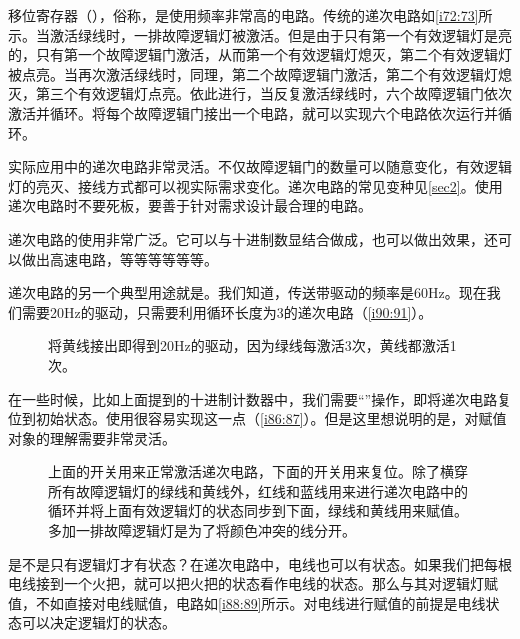 移位寄存器（），俗称，是使用频率非常高的电路。传统的递次电路如\autoref{i72:73}所示。当激活绿线时，一排故障逻辑灯被激活。但是由于只有第一个有效逻辑灯是亮的，只有第一个故障逻辑门激活，从而第一个有效逻辑灯熄灭，第二个有效逻辑灯被点亮。当再次激活绿线时，同理，第二个故障逻辑门激活，第二个有效逻辑灯熄灭，第三个有效逻辑灯点亮。依此进行，当反复激活绿线时，六个故障逻辑门依次激活并循环。将每个故障逻辑门接出一个电路，就可以实现六个电路依次运行并循环。

\begin{figure}[!ht]
\centering
{}%
%
\caption{}
\label{i72:73}
\end{figure}

实际应用中的递次电路非常灵活。不仅故障逻辑门的数量可以随意变化，有效逻辑灯的亮灭、接线方式都可以视实际需求变化。递次电路的常见变种见\autoref{sec2}。使用递次电路时不要死板，要善于针对需求设计最合理的电路。

递次电路的使用非常广泛。它可以与十进制数显结合做成，也可以做出效果，还可以做出高速电路，等等等等等等。

递次电路的另一个典型用途就是。我们知道，传送带驱动的频率是60Hz。现在我们需要20Hz的驱动，只需要利用循环长度为3的递次电路（\autoref{i90:91}）。

\begin{figure}[!ht]
\centering
{}%
%
\caption{将黄线接出即得到20Hz的驱动，因为绿线每激活3次，黄线都激活1次。}
\label{i90:91}
\end{figure}

在一些时候，比如上面提到的十进制计数器中，我们需要“”操作，即将递次电路复位到初始状态。使用很容易实现这一点（\autoref{i86:87}）。但是这里想说明的是，对赋值对象的理解需要非常灵活。

\begin{figure}[!ht]
\centering
{}%
%
\caption{上面的开关用来正常激活递次电路，下面的开关用来复位。除了横穿所有故障逻辑灯的绿线和黄线外，红线和蓝线用来进行递次电路中的循环并将上面有效逻辑灯的状态同步到下面，绿线和黄线用来赋值。多加一排故障逻辑灯是为了将颜色冲突的线分开。}
\label{i86:87}
\end{figure}

是不是只有逻辑灯才有状态？在递次电路中，电线也可以有状态。如果我们把每根电线接到一个火把，就可以把火把的状态看作电线的状态。那么与其对逻辑灯赋值，不如直接对电线赋值，电路如\autoref{i88:89}所示。对电线进行赋值的前提是电线状态可以决定逻辑灯的状态。

